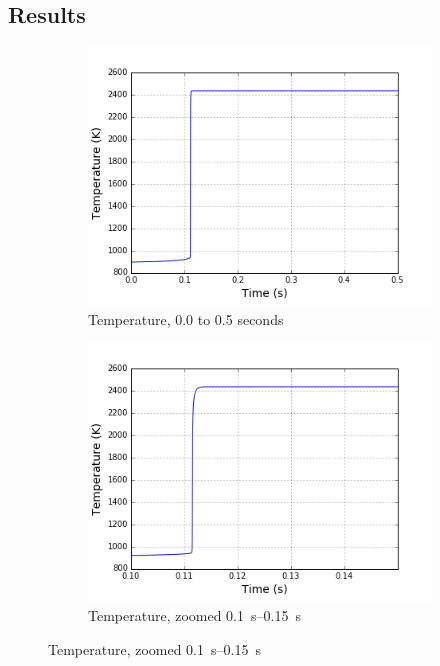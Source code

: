 \documentclass[12pt]{ussci}
\begin{document}
\subsection{Results}

\begin{figure}[htbp]
    \centering
    \begin{subfigure}{0.43\textwidth}
        \includegraphics[width=\linewidth]{IndexVals_1e-07_temp.png}
        \caption{Temperature, 0.0 to 0.5 seconds}
        \label{fig:tempcurve0}
    \end{subfigure}
    \begin{subfigure}{0.43\textwidth}
        \includegraphics[width=\linewidth]{IndexVals_1e-07_temp_1.png}
        \caption{Temperature, zoomed \SIrange{0.1}{0.15}{\second}}

\end{subfigure}
\end{figure}
\end{document}
